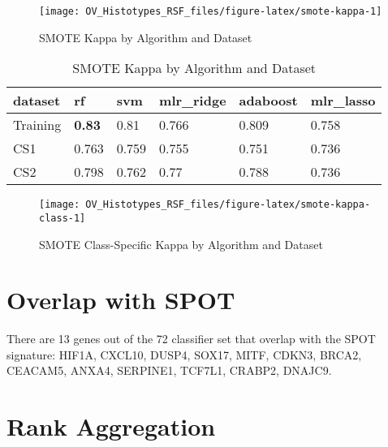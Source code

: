 \documentclass[
]{report}
\begin{document}
\begin{figure}[H]

{\centering \texttt{[image: OV\_Histotypes\_RSF\_files/figure-latex/smote-kappa-1]} 

}

\caption{SMOTE Kappa by Algorithm and Dataset}\label{fig:smote-kappa}
\end{figure}

\begin{table}

\caption{\label{tab:smote-kappa-table}SMOTE Kappa by Algorithm and Dataset}
\centering
\begin{tabular}[t]{l|l|l|l|l|l}
\hline
dataset & rf & svm & mlr\_ridge & adaboost & mlr\_lasso\\
\hline
Training & \textbf{0.83} & 0.81 & 0.766 & 0.809 & 0.758\\
\hline
CS1 & 0.763 & 0.759 & 0.755 & 0.751 & 0.736\\
\hline
CS2 & 0.798 & 0.762 & 0.77 & 0.788 & 0.736\\
\hline
\end{tabular}
\end{table}

\begin{figure}[H]

{\centering \texttt{[image: OV\_Histotypes\_RSF\_files/figure-latex/smote-kappa-class-1]} 

}

\caption{SMOTE Class-Specific Kappa by Algorithm and Dataset}\label{fig:smote-kappa-class}
\end{figure}

\hypertarget{overlap-with-spot}{%
\section{Overlap with SPOT}\label{overlap-with-spot}}

There are 13 genes out of the 72 classifier set that overlap with the SPOT signature: HIF1A, CXCL10, DUSP4, SOX17, MITF, CDKN3, BRCA2, CEACAM5, ANXA4, SERPINE1, TCF7L1, CRABP2, DNAJC9.

\hypertarget{rank-aggregation}{%
\section{Rank Aggregation}\label{rank-aggregation}}
\end{document}

